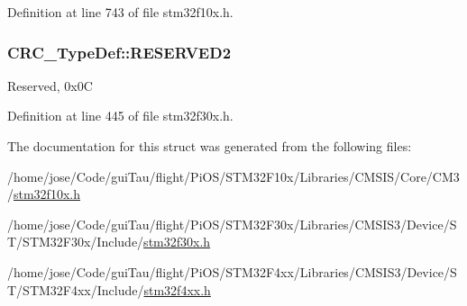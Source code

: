Definition at line 743 of file stm32f10x.\-h.

\hypertarget{struct_c_r_c___type_def_a4dd260a7d589d62975619a42f9a6abe4}{
\subsubsection[{R\-E\-S\-E\-R\-V\-E\-D2}]{ C\-R\-C\-\_\-\-Type\-Def\-::\-R\-E\-S\-E\-R\-V\-E\-D2}}\label{struct_c_r_c___type_def_a4dd260a7d589d62975619a42f9a6abe4}
Reserved, 0x0\-C 

Definition at line 445 of file stm32f30x.\-h.



The documentation for this struct was generated from the following files\-:\begin{DoxyCompactItemize}
\item 
/home/jose/\-Code/gui\-Tau/flight/\-Pi\-O\-S/\-S\-T\-M32\-F10x/\-Libraries/\-C\-M\-S\-I\-S/\-Core/\-C\-M3/\hyperlink{stm32f10x_8h}{stm32f10x.\-h}\item 
/home/jose/\-Code/gui\-Tau/flight/\-Pi\-O\-S/\-S\-T\-M32\-F30x/\-Libraries/\-C\-M\-S\-I\-S3/\-Device/\-S\-T/\-S\-T\-M32\-F30x/\-Include/\hyperlink{stm32f30x_8h}{stm32f30x.\-h}\item 
/home/jose/\-Code/gui\-Tau/flight/\-Pi\-O\-S/\-S\-T\-M32\-F4xx/\-Libraries/\-C\-M\-S\-I\-S3/\-Device/\-S\-T/\-S\-T\-M32\-F4xx/\-Include/\hyperlink{stm32f4xx_8h}{stm32f4xx.\-h}\end{DoxyCompactItemize}
